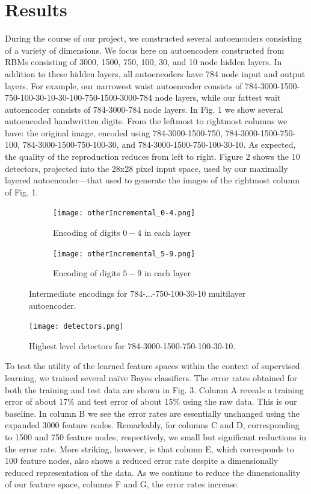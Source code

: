 \documentclass{article}
\begin{document}
\section{Results}\label{sec:results}

During the course of our project, we constructed several autoencoders consisting
of a variety of dimensions. We focus here on autoencoders constructed from RBMs
consisting of 3000, 1500, 750, 100, 30, and 10 node hidden layers. In addition
to these hidden layers, all autoencoders have 784 node input and output layers.
For example, our narrowest waist autoencoder consists of
784-3000-1500-750-100-30-10-30-100-750-1500-3000-784 node layers, while our
fattest wait autoencoder consists of 784-3000-784 node layers. In Fig. 1 we show
several autoencoded handwritten digits. From the leftmost to rightmost columns
we have: the original image, encoded using 784-3000-1500-750,
784-3000-1500-750-100, 784-3000-1500-750-100-30, and
784-3000-1500-750-100-30-10. As expected, the quality of the reproduction
reduces from left to right. Figure 2 shows the 10 detectors, projected into the
28x28 pixel input space, used by our maximally layered autoencoder---that used
to generate the images of the rightmost column of Fig. 1.

\begin{figure}[htbp!]
    \centering
    \begin{subfigure}{.45\textwidth}
        \centering
        \texttt{[image: otherIncremental\_0-4.png]}
        \caption{Encoding of digits $0-4$ in each layer}
        \label{fig:incremental_0-4}
    \end{subfigure}%
    \quad
    \begin{subfigure}{.45\textwidth}
        \centering
        \texttt{[image: otherIncremental\_5-9.png]}
        \caption{Encoding of digits $5-9$ in each layer}
        \label{fig:incremental_5-9}
    \end{subfigure}
    \caption{Intermediate encodings for 784-...-750-100-30-10 multilayer autoencoder.}
\end{figure}

\begin{figure}[htbp!]
    \centering
    \texttt{[image: detectors.png]}
    \caption{Highest level detectors for 784-3000-1500-750-100-30-10.}
    \label{fig:detectors}
\end{figure}%

To test the utility of the learned feature spaces within the context of
supervised learning, we trained several na\"{i}ve Bayes classifiers. The error rates
obtained for both the training and test data are shown in Fig. 3. Column A
reveals a training error of about 17\% and test error of about 15\% using the
raw data. This is our baseline. In column B we see the error rates are
essentially unchanged using the expanded 3000 feature nodes. Remarkably, for
columns C and D, corresponding to 1500 and 750 feature nodes, respectively, we
small but significant reductions in the error rate. More striking, however, is
that column E, which corresponds to 100 feature nodes, also shows a reduced
error rate despite a dimensionally reduced representation of the data. As we
continue to reduce the dimensionality of our feature space, columns F and G, the
error rates increase.
\end{document}
